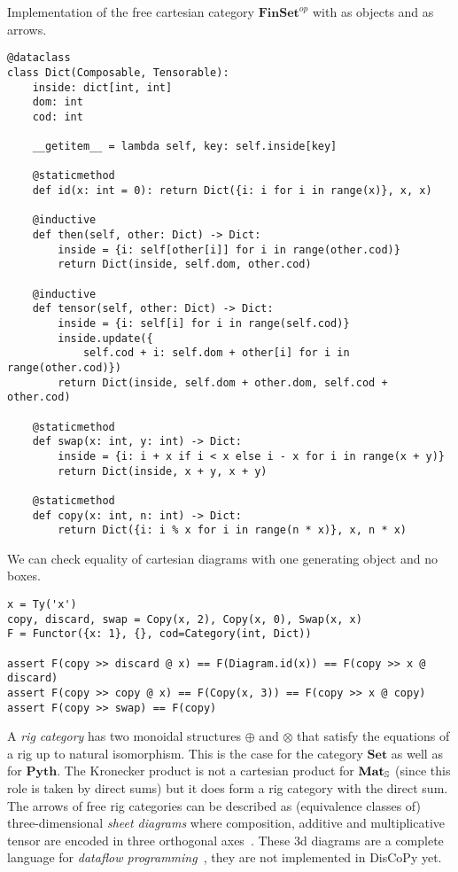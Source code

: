 \begin{python}
Implementation of the free cartesian category $\mathbf{FinSet}^{op}$ with  as objects and  as arrows.

\begin{verbatim}
@dataclass
class Dict(Composable, Tensorable):
    inside: dict[int, int]
    dom: int
    cod: int

    __getitem__ = lambda self, key: self.inside[key]

    @staticmethod
    def id(x: int = 0): return Dict({i: i for i in range(x)}, x, x)

    @inductive
    def then(self, other: Dict) -> Dict:
        inside = {i: self[other[i]] for i in range(other.cod)}
        return Dict(inside, self.dom, other.cod)

    @inductive
    def tensor(self, other: Dict) -> Dict:
        inside = {i: self[i] for i in range(self.cod)}
        inside.update({
            self.cod + i: self.dom + other[i] for i in range(other.cod)})
        return Dict(inside, self.dom + other.dom, self.cod + other.cod)

    @staticmethod
    def swap(x: int, y: int) -> Dict:
        inside = {i: i + x if i < x else i - x for i in range(x + y)}
        return Dict(inside, x + y, x + y)

    @staticmethod
    def copy(x: int, n: int) -> Dict:
        return Dict({i: i % x for i in range(n * x)}, x, n * x)
\end{verbatim}
\end{python}

\begin{example}
We can check equality of cartesian diagrams with one generating object and no boxes.

\begin{verbatim}
x = Ty('x')
copy, discard, swap = Copy(x, 2), Copy(x, 0), Swap(x, x)
F = Functor({x: 1}, {}, cod=Category(int, Dict))

assert F(copy >> discard @ x) == F(Diagram.id(x)) == F(copy >> x @ discard)
assert F(copy >> copy @ x) == F(Copy(x, 3)) == F(copy >> x @ copy)
assert F(copy >> swap) == F(copy)
\end{verbatim}
\end{example}

A \emph{rig category} has two monoidal structures $\oplus$ and $\otimes$ that satisfy the equations of a rig up to natural isomorphism.
This is the case for the category $\mathbf{Set}$ as well as for $\mathbf{Pyth}$.
The Kronecker product is not a cartesian product for $\mathbf{Mat}_\S$ (since this role is taken by direct sums) but it does form a rig category with the direct sum.
The arrows of free rig categories can be described as (equivalence classes of) three-dimensional \emph{sheet diagrams} where composition, additive and multiplicative tensor are encoded in three orthogonal axes~\cite{ComfortEtAl20}.
These 3d diagrams are a complete language for \emph{dataflow programming}~\cite{Delpeuch20a}, they are not implemented in DisCoPy yet.

